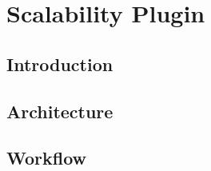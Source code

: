 \section{Scalability Plugin}
\subsection{Introduction}
\subsection{Architecture}
\subsection{Workflow}
